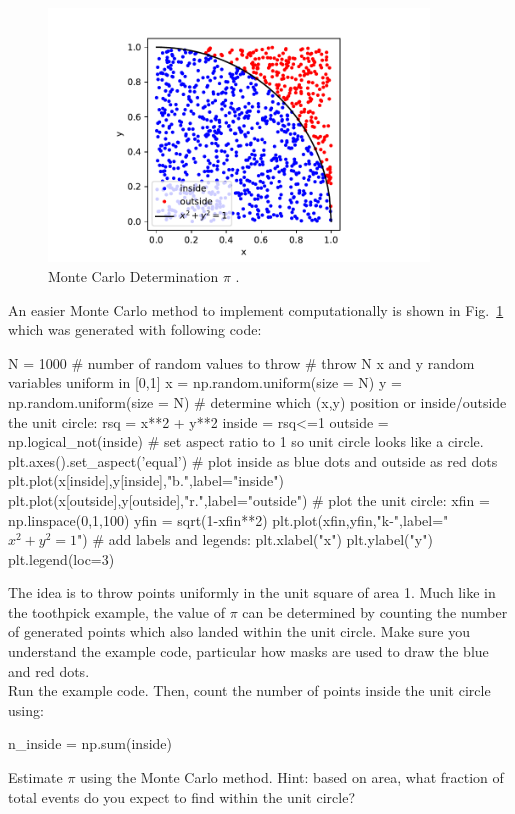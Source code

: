 {\begin{figure}[htbp]
\begin{center}
  \includegraphics[width=0.9\textwidth]{figs/ideal_gas/pimc.pdf}
\caption{Monte Carlo Determination $\pi$ .}
\label{fig:pimc}
\end{center}
\end{figure}

An easier Monte Carlo method to implement computationally is 
shown in Fig.~\ref{fig:pimc} which was generated with following code:
\begin{python}
N = 1000 # number of random values to throw
# throw N x and y random variables uniform in [0,1]
x = np.random.uniform(size = N)
y = np.random.uniform(size = N)
# determine which (x,y) position or inside/outside the unit circle:
rsq = x**2 + y**2
inside  = rsq<=1
outside = np.logical_not(inside)
# set aspect ratio to 1 so unit circle looks like a circle.
plt.axes().set_aspect('equal')
# plot inside as blue dots and outside as red dots
plt.plot(x[inside],y[inside],"b.",label="inside")
plt.plot(x[outside],y[outside],"r.",label="outside")
# plot the unit circle:
xfin = np.linspace(0,1,100)
yfin = sqrt(1-xfin**2)
plt.plot(xfin,yfin,"k-",label="$x^2+y^2=1$")
# add labels and legends:
plt.xlabel("x")
plt.ylabel("y")
plt.legend(loc=3)
\end{python}
The idea is to throw points uniformly in the unit square of area 1.
Much like in the toothpick example, the value of $\pi$ can be
determined by counting the number of generated points which also
landed within the unit circle.  Make sure you understand the example
code, particular how masks are used to draw the blue and red dots.\\

\plot Run the example code.  Then, count the number of points inside the unit circle using:
\begin{python}
n_inside = np.sum(inside)
\end{python}
Estimate $\pi$ using the Monte Carlo method.  Hint: based on area, what fraction of total events do you expect to find within the unit circle?\\

}
